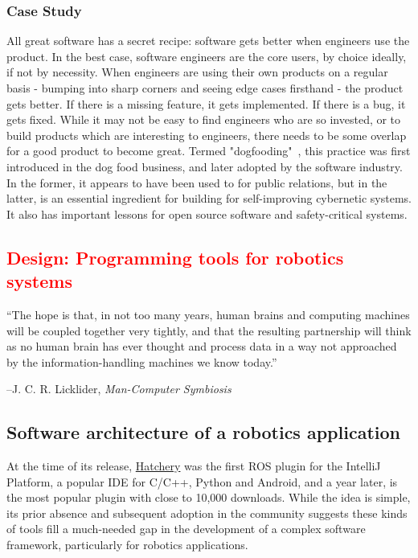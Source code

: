 \documentclass[12pt,initial,twoside,maitrise]{dms}
\newcommand{\rare}[1]{\textcolor{red}{#1}}
\numberwithin{equation}{section}
\numberwithin{table}{chapter}
\numberwithin{figure}{chapter}
\begin{document}
\subsection{Case Study}\label{subsec:case-study}

All great software has a secret recipe: software gets better when engineers use the product. In the best case, software engineers are the core users, by choice ideally, if not by necessity. When engineers are using their own products on a regular basis - bumping into sharp corners and seeing edge cases firsthand - the product gets better. If there is a missing feature, it gets implemented. If there is a bug, it gets fixed. While it may not be easy to find engineers who are so invested, or to build products which are interesting to engineers, there needs to be some overlap for a good product to become great. Termed "dogfooding"~\cite{harrison2006eating}, this practice was first introduced in the dog food business, and later adopted by the software industry. In the former, it appears to have been used to for public relations, but in the latter, is an essential ingredient for building for self-improving cybernetic systems. It also has important lessons for open source software and safety-critical systems.

\rare{\chapter{Design: Programming tools for robotics systems}\label{ch:hatchery}}
\setlength{\epigraphwidth}{0.78\textwidth}
\epigraph{``The hope is that, in not too many years, human brains and computing machines will be coupled together very tightly, and that the resulting partnership will think as no human brain has ever thought and process data in a way not approached by the information-handling machines we know today.''}{\begin{flushright}--J. C. R. Licklider, \textit{Man-Computer Symbiosis}~\cite{licklider1960man}\end{flushright}}

\section{Software architecture of a robotics application}

At the time of its release, \href{https://github.com/duckietown/hatchery}{Hatchery} was the first ROS plugin for the IntelliJ Platform, a popular IDE for C/C++, Python and Android, and a year later, is the most popular plugin with close to 10,000 downloads. While the idea is simple, its prior absence and subsequent adoption in the community suggests these kinds of tools fill a much-needed gap in the development of a complex software framework, particularly for robotics applications.
\end{document}
